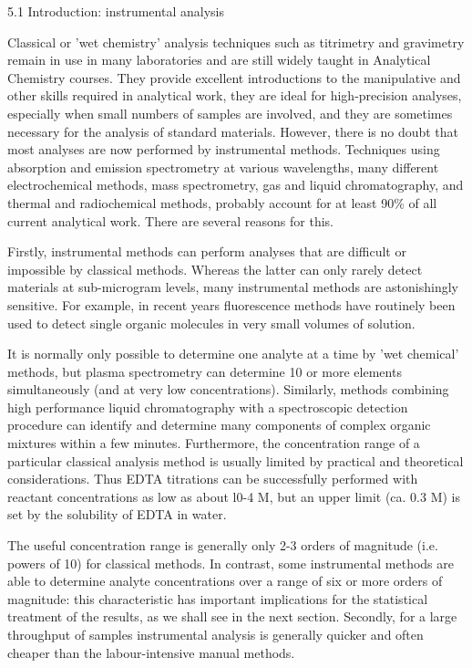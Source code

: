 5.1 Introduction: instrumental analysis

Classical or 'wet chemistry' analysis techniques such as titrimetry and gravimetry remain in use in many laboratories and are still widely taught in Analytical Chemistry courses. They provide excellent introductions to the manipulative and other skills required in analytical work, they are ideal for high-precision analyses, especially when small numbers of samples are involved, and they are sometimes necessary for the analysis of standard materials.
However, there is no doubt that most analyses are now performed by instrumental methods. Techniques using absorption and emission spectrometry at various wavelengths, many different electrochemical methods, mass spectrometry, gas and liquid chromatography, and thermal and radiochemical methods, probably account for at least 90\% of all current analytical work. There are several reasons for this.

Firstly, instrumental methods can perform analyses that are difficult or impossible by classical methods. Whereas the latter can only rarely detect materials at sub-microgram levels, many instrumental methods are astonishingly sensitive. For example, in recent years fluorescence methods have routinely been used to detect single organic molecules in very small volumes of solution.

It is normally only possible to determine one analyte at a time by 'wet chemical’ methods, but plasma spectrometry can determine 10 or more elements simultaneously (and at very low concentrations).
Similarly, methods combining high performance liquid chromatography with a spectroscopic detection procedure can identify and determine many components of complex organic mixtures within a few minutes.
Furthermore, the concentration range of a particular classical analysis method is usually limited by practical and theoretical considerations. Thus EDTA titrations can be successfully performed with reactant concentrations as low as about l0-4 M, but an upper limit (ca. 0.3 M) is set by the solubility of EDTA in water.


The useful concentration range is generally only 2-3 orders of magnitude (i.e. powers of 10) for classical methods. In contrast, some instrumental methods are able to determine analyte concentrations over a range of six or more orders of magnitude: this characteristic has important implications for the statistical treatment of the results, as we shall see in the next section.
Secondly, for a large throughput of samples instrumental analysis is generally quicker and often cheaper than the labour-intensive manual methods.

